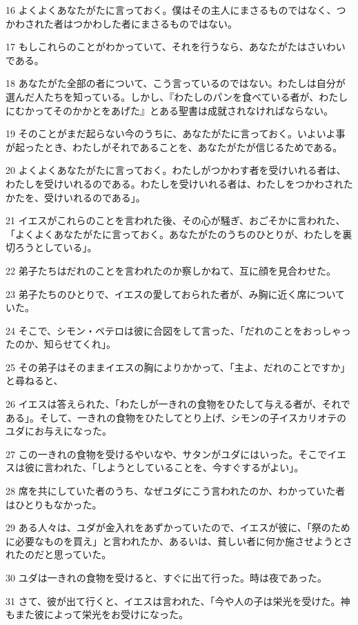\par 16 よくよくあなたがたに言っておく。僕はその主人にまさるものではなく、つかわされた者はつかわした者にまさるものではない。
\par 17 もしこれらのことがわかっていて、それを行うなら、あなたがたはさいわいである。
\par 18 あなたがた全部の者について、こう言っているのではない。わたしは自分が選んだ人たちを知っている。しかし、『わたしのパンを食べている者が、わたしにむかってそのかかとをあげた』とある聖書は成就されなければならない。
\par 19 そのことがまだ起らない今のうちに、あなたがたに言っておく。いよいよ事が起ったとき、わたしがそれであることを、あなたがたが信じるためである。
\par 20 よくよくあなたがたに言っておく。わたしがつかわす者を受けいれる者は、わたしを受けいれるのである。わたしを受けいれる者は、わたしをつかわされたかたを、受けいれるのである」。
\par 21 イエスがこれらのことを言われた後、その心が騒ぎ、おごそかに言われた、「よくよくあなたがたに言っておく。あなたがたのうちのひとりが、わたしを裏切ろうとしている」。
\par 22 弟子たちはだれのことを言われたのか察しかねて、互に顔を見合わせた。
\par 23 弟子たちのひとりで、イエスの愛しておられた者が、み胸に近く席についていた。
\par 24 そこで、シモン・ペテロは彼に合図をして言った、「だれのことをおっしゃったのか、知らせてくれ」。
\par 25 その弟子はそのままイエスの胸によりかかって、「主よ、だれのことですか」と尋ねると、
\par 26 イエスは答えられた、「わたしが一きれの食物をひたして与える者が、それである」。そして、一きれの食物をひたしてとり上げ、シモンの子イスカリオテのユダにお与えになった。
\par 27 この一きれの食物を受けるやいなや、サタンがユダにはいった。そこでイエスは彼に言われた、「しようとしていることを、今すぐするがよい」。
\par 28 席を共にしていた者のうち、なぜユダにこう言われたのか、わかっていた者はひとりもなかった。
\par 29 ある人々は、ユダが金入れをあずかっていたので、イエスが彼に、「祭のために必要なものを買え」と言われたか、あるいは、貧しい者に何か施させようとされたのだと思っていた。
\par 30 ユダは一きれの食物を受けると、すぐに出て行った。時は夜であった。
\par 31 さて、彼が出て行くと、イエスは言われた、「今や人の子は栄光を受けた。神もまた彼によって栄光をお受けになった。
